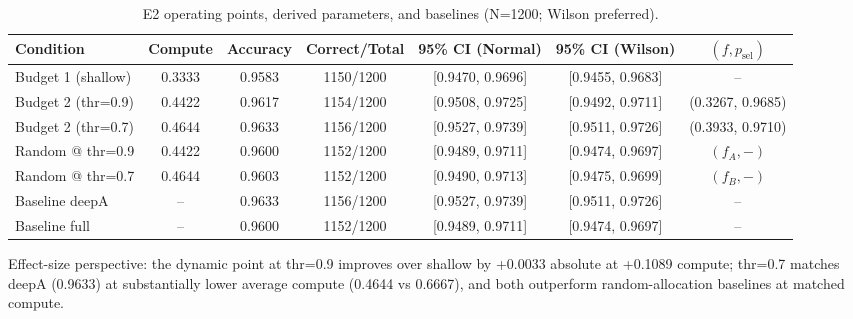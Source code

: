\begin{table}[H]
  \centering
  \caption{E2 operating points, derived parameters, and baselines (N=1200; Wilson preferred).}
  \vspace{0.25em}
  \begin{adjustbox}{width=\linewidth}
  \begin{tabular}{l c c c c c c}
    \toprule
    Condition & Compute & Accuracy & Correct/Total & 95\% CI (Normal) & 95\% CI (Wilson) & $(f, p_{\mathrm{sel}})$ \\
    \midrule
    Budget 1 (shallow) & 0.3333 & 0.9583 & 1150/1200 & [0.9470, 0.9696] & [0.9455, 0.9683] & -- \\
    Budget 2 (thr=0.9) & 0.4422 & 0.9617 & 1154/1200 & [0.9508, 0.9725] & [0.9492, 0.9711] & (0.3267, 0.9685) \\
    Budget 2 (thr=0.7) & 0.4644 & 0.9633 & 1156/1200 & [0.9527, 0.9739] & [0.9511, 0.9726] & (0.3933, 0.9710) \\
    \midrule
    Random @ thr=0.9 & 0.4422 & 0.9600 & 1152/1200 & [0.9489, 0.9711] & [0.9474, 0.9697] & $(f_A, -)$ \\
    Random @ thr=0.7 & 0.4644 & 0.9603 & 1152/1200 & [0.9490, 0.9713] & [0.9475, 0.9699] & $(f_B, -)$ \\
    Baseline deepA & -- & 0.9633 & 1156/1200 & [0.9527, 0.9739] & [0.9511, 0.9726] & -- \\
    Baseline full  & -- & 0.9600 & 1152/1200 & [0.9489, 0.9711] & [0.9474, 0.9697] & -- \\
    \bottomrule
  \end{tabular}
  \end{adjustbox}
\end{table}

Effect-size perspective: the dynamic point at thr=0.9 improves over shallow by +0.0033 absolute at +0.1089 compute; thr=0.7 matches deepA (0.9633) at substantially lower average compute (0.4644 vs 0.6667), and both outperform random-allocation baselines at matched compute.

